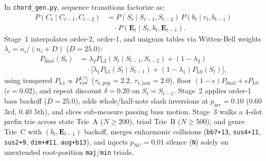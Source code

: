 \documentclass{article}
\begin{document}
In {\small\texttt{chord\_gen.py}}, sequence transitions factorize as:
\begin{equation}\label{eq:chord_factorization}
  \begin{split}
    P(C_t \!\mid\! C_{t-1}, C_{t-2}) &= P(S_t \!\mid\! S_{t-1}, S_{t-2})\,P(b_t \!\mid\! r_t, b_{t-1}) \\
    &\quad \cdot P(\mathbf{E}_t \!\mid\! S_t, b_t, \mathbf{E}_{t-1}).
  \end{split}
\end{equation}
Stage~1 interpolates order-2, order-1, and unigram tables via Witten-Bell weights $\lambda_i = n_i / (n_i + D)$ ($D = 25.0$):
\begin{equation}\label{eq:wb_backoff}
  \begin{split}
    P_{\text{final}}(S_t) &= \lambda_2 P_{\text{L2}}(S_t \!\mid\! S_{t-1}, S_{t-2}) + (1 - \lambda_2) \\
    &\quad \cdot \bigl[\lambda_1 P_{\text{L1}}(S_t \!\mid\! S_{t-1}) + (1 - \lambda_1) P_{\text{L0}}(S_t)\bigr],
  \end{split}
\end{equation}
using tempered $P_{\text{L1}} \propto P_{\text{raw}}^{1/\tau_1}$ ($\tau_{1,\text{pop}} = 2.2$, $\tau_{1,\text{jazz}} = 2.0$), floor $(1 - \epsilon) P_{\text{final}} + \epsilon P_{\text{L0}}$ ($\epsilon = 0.02$), and repeat discount $\delta = 0.20$ on $S_t = S_{t-1}$. Stage~2 applies order-1 bass backoff ($D = 25.0$), adds whole/half-note slash inversions at $p_{\text{inv}} = 0.10$ ($0.60$ $3\text{rd}$, $0.40$ $5\text{th}$), and slices sub-measure passing bass motion. Stage~3 walks a 4-slot prefix trie across state Trie~A ($N \ge 200$), triad Trie~B ($N \ge 500$), and genre Trie~C with $(b_t, \mathbf{E}_{t-1})$ backoff, merges enharmonic collisions ({\small\texttt{bb7+13}}, {\small\texttt{sus4+11}}, {\small\texttt{sus2+9}}, {\small\texttt{dim+\#11}}, {\small\texttt{aug+b13}}), and injects $p_{\text{NC}} = 0.01$ silence ({\small\texttt{N}}) solely on unextended root-position {\small\texttt{maj}}/{\small\texttt{min}} triads.
\end{document}
